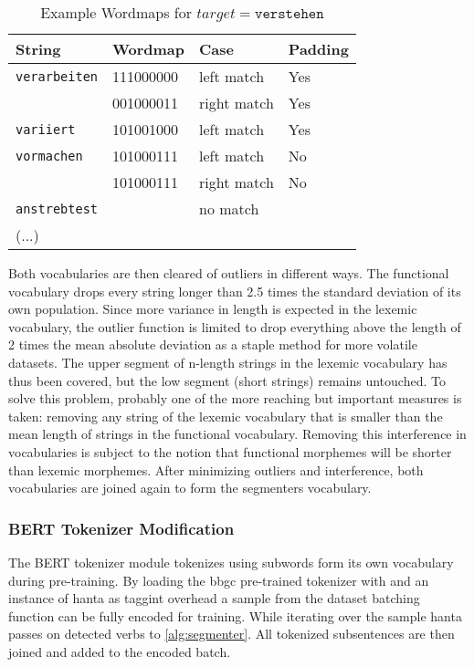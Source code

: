 \begin{table}[H]
    \centering
    \caption{Example Wordmaps for $target = \texttt{verstehen}$}
    \label{tab:wordmaps}
    \begin{tabular}{llll}
        \toprule
        \textbf{String} & \textbf{Wordmap} & \textbf{Case} & \textbf{Padding} \\
        \midrule
        \texttt{verarbeiten} & 111000000 & left match & Yes \\
        & 001000011 & right match & Yes \\
        \texttt{variiert} & 101001000 & left match & Yes \\
        \texttt{vormachen} & 101000111 & left match & No \\
        & 101000111 & right match & No \\
        \texttt{anstrebtest} &  & no match &   \\
        (...) &  &  &  \\
        \bottomrule
    \end{tabular}
\end{table}

Both vocabularies are then cleared of outliers in different ways.
The functional vocabulary drops every string longer than 2.5 times the standard deviation of its own population.
Since more variance in length is expected in the lexemic vocabulary, the outlier function is limited to drop everything above the length  of 2 times the mean absolute deviation as a staple method for more volatile datasets.
The upper segment of n-length strings in the lexemic vocabulary has thus been covered, but the low segment (short strings) remains untouched.
To solve this problem, probably one of the more reaching but important measures is taken: removing any string of the lexemic vocabulary that is smaller than the mean length of strings in the functional vocabulary.
Removing this interference in vocabularies is subject to the notion that functional morphemes will be shorter than lexemic morphemes.
After minimizing outliers and interference, both vocabularies are joined again to form the segmenters vocabulary.

\subsubsection{BERT Tokenizer Modification}
\label{subsubsec:tokenizer-modification}
The BERT tokenizer module tokenizes using subwords form its own vocabulary during pre-training.
By loading the \ac{bbgc} pre-trained tokenizer with and an instance of \ac{hanta} as taggint overhead a sample from the dataset batching function can be fully encoded for training.
While iterating over the sample \ac{hanta} passes on detected verbs to \autoref{alg:segmenter}.
All tokenized subsentences are then joined and added to the encoded batch.

